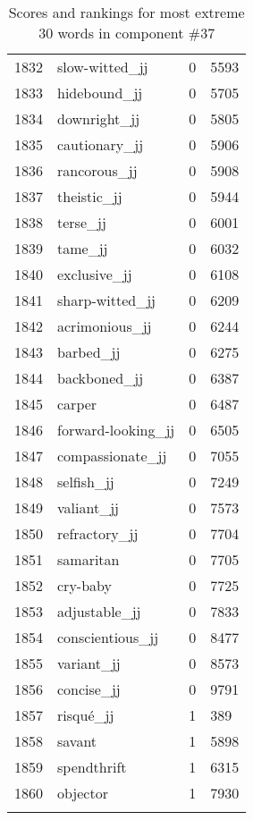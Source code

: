\begin{longtable}[!htbp]{| rlr@{.}l |}
    1832 & slow-witted\_jj & 0 & 5593 \\
    1833 & hidebound\_jj & 0 & 5705 \\
    1834 & downright\_jj & 0 & 5805 \\
    1835 & cautionary\_jj & 0 & 5906 \\
    1836 & rancorous\_jj & 0 & 5908 \\
    1837 & theistic\_jj & 0 & 5944 \\
    1838 & terse\_jj & 0 & 6001 \\
    1839 & tame\_jj & 0 & 6032 \\
    1840 & exclusive\_jj & 0 & 6108 \\
    1841 & sharp-witted\_jj & 0 & 6209 \\
    1842 & acrimonious\_jj & 0 & 6244 \\
    1843 & barbed\_jj & 0 & 6275 \\
    1844 & backboned\_jj & 0 & 6387 \\
    1845 & carper & 0 & 6487 \\
    1846 & forward-looking\_jj & 0 & 6505 \\
    1847 & compassionate\_jj & 0 & 7055 \\
    1848 & selfish\_jj & 0 & 7249 \\
    1849 & valiant\_jj & 0 & 7573 \\
    1850 & refractory\_jj & 0 & 7704 \\
    1851 & samaritan & 0 & 7705 \\
    1852 & cry-baby & 0 & 7725 \\
    1853 & adjustable\_jj & 0 & 7833 \\
    1854 & conscientious\_jj & 0 & 8477 \\
    1855 & variant\_jj & 0 & 8573 \\
    1856 & concise\_jj & 0 & 9791 \\
    1857 & risqué\_jj & 1 & 389 \\
    1858 & savant & 1 & 5898 \\
    1859 & spendthrift & 1 & 6315 \\
    1860 & objector & 1 & 7930 \\
    \hline
    \caption{Scores and rankings for most extreme 30 words in component \#37} \\
\end{longtable}

